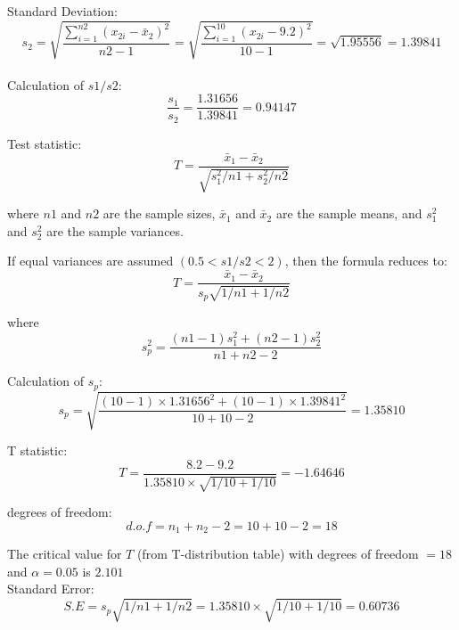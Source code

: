 \documentclass[a4paper,11pt,openright]{report}
\begin{document}
\begin{enumerate}
\hspace*{10mm} Standard Deviation:
\begin{equation*}
s_{2} = \sqrt{\frac{\sum\limits_{i=1}^{n2} (x_{2i} - \bar x_{2})^{2}}{n2 - 1}}
= \sqrt{\frac{\sum\limits_{i=1}^{10} (x_{2i} - 9.2)^{2}}{10 -1}}
= \sqrt{1.95556} = 1.39841
\end{equation*} \\

Calculation of $s1/s2$:
\begin{equation*}
\frac{s_{1}}{s_{2}} = \frac{1.31656}{1.39841} = 0.94147
\end{equation*}

Test statistic: 
\begin{equation*}
T = \frac{\bar x_{1} - \bar x_{2}}{\sqrt{s_{1}^{2}/n1 + s_{2}^{2}/n2}}
\end{equation*}

where $n1$ and $n2$ are the sample sizes, $\bar x_{1}$ and $\bar x_{2}$ are the sample
means, and $s_{1}^{2}$ and $s_{2}^{2}$ are the sample variances. 

If equal variances are assumed $(0.5 < s1/s2 < 2)$, then the formula reduces to:
\begin{equation*}
T = \frac{\bar x_{1} - \bar x_{2}}{s_{p} \sqrt{1/n1 + 1/n2}}
\end{equation*}

where
\begin{equation*}
s_{p}^{2} = \frac{(n1-1)s_{1}^{2} + (n2-1)s_{2}^{2}}{n1+n2-2}
\end{equation*}

Calculation of $s_{p}$:
\begin{equation*}
s_{p} = \sqrt{\frac{(10-1) \times 1.31656^{2} + (10-1) \times 1.39841^{2}}{10+10-2}} 
      = 1.35810
\end{equation*}

T statistic:
\begin{equation*}
T = \frac{8.2 - 9.2}{1.35810 \times \sqrt{1/10 + 1/10}} = -1.64646
\end{equation*}

degrees of freedom:
\begin{equation*}
d.o.f = n_{1} + n_{2} - 2 = 10 + 10 - 2 = 18
\end{equation*}

The critical value for $T$ (from T-distribution table) with degrees of freedom $= 18$ and 
$\alpha = 0.05$ is $2.101$ \\

Standard Error:
\begin{equation*}
S.E = s_{p} \sqrt{1/n1 + 1/n2} = 1.35810 \times \sqrt{1/10 + 1/10} = 0.60736
\end{equation*}


\end{enumerate}
\end{document}
